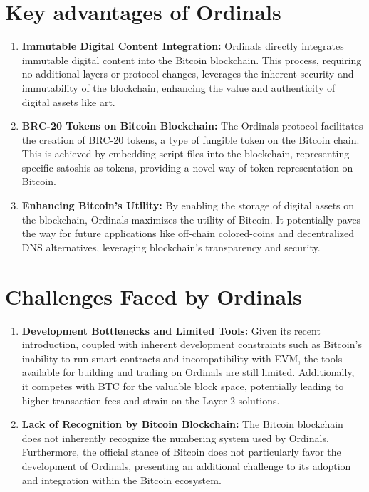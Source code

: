 \section{Key advantages of Ordinals}
\begin{enumerate}
    \item \textbf{Immutable Digital Content Integration:}
    Ordinals directly integrates immutable digital content into the Bitcoin blockchain. This process, requiring no additional layers or protocol changes, leverages the inherent security and immutability of the blockchain, enhancing the value and authenticity of digital assets like art.

    \item \textbf{BRC-20 Tokens on Bitcoin Blockchain:}
    The Ordinals protocol facilitates the creation of BRC-20 tokens, a type of fungible token on the Bitcoin chain. This is achieved by embedding script files into the blockchain, representing specific satoshis as tokens, providing a novel way of token representation on Bitcoin.

    \item \textbf{Enhancing Bitcoin's Utility:}
    By enabling the storage of digital assets on the blockchain, Ordinals maximizes the utility of Bitcoin. It potentially paves the way for future applications like off-chain colored-coins and decentralized DNS alternatives, leveraging blockchain's transparency and security.
\end{enumerate}

\section{Challenges Faced by Ordinals}

\begin{enumerate}
    \item \textbf{Development Bottlenecks and Limited Tools:}
    Given its recent introduction, coupled with inherent development constraints such as Bitcoin's inability to run smart contracts and incompatibility with EVM, the tools available for building and trading on Ordinals are still limited. Additionally, it competes with BTC for the valuable block space, potentially leading to higher transaction fees and strain on the Layer 2 solutions.

    \item \textbf{Lack of Recognition by Bitcoin Blockchain:}
    The Bitcoin blockchain does not inherently recognize the numbering system used by Ordinals. Furthermore, the official stance of Bitcoin does not particularly favor the development of Ordinals, presenting an additional challenge to its adoption and integration within the Bitcoin ecosystem.
\end{enumerate}

